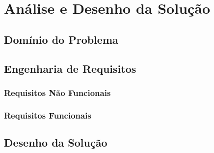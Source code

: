 \chapter{Análise e Desenho da Solução}
\label{sec:3-Analise}



\section{Domínio do Problema}


\section{Engenharia de Requisitos}



\subsection{Requisitos Não Funcionais}


\subsection{Requisitos Funcionais}
\label{sec:3-rf}



\section{Desenho da Solução}

